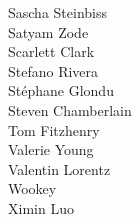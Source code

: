 \documentclass[14pt]{beamer}
\begin{document}
\begin{frame}
\begin{center}
\begin{columns}
    {Sascha Steinbiss} \\
    {Satyam Zode} \\
    {Scarlett Clark} \\
    {Stefano Rivera} \\
    {Stéphane Glondu} \\
    {Steven Chamberlain} \\
    Tom Fitzhenry \\
    {Valerie Young} \\
    Valentin Lorentz \\
    {Wookey} \\
    {Ximin Luo} \\
  \end{columns}
 \end{center}
\end{frame}
\end{document}
